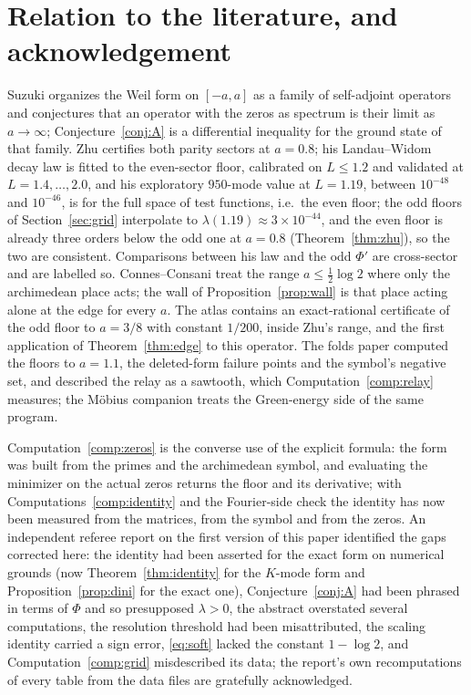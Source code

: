 \documentclass[11pt]{article}
\theoremstyle{definition}
\theoremstyle{remark}
\begin{document}
\section{Relation to the literature, and acknowledgement}\label{sec:lit}

Suzuki \cite{suzuki-screw} organizes the Weil form on $[-a,a]$ as a family of self-adjoint operators and conjectures that an operator with the zeros as spectrum is their limit as $a\to\infty$; Conjecture~\ref{conj:A} is a differential inequality for the ground state of that family. Zhu \cite{zhu} certifies both parity sectors at $a=0.8$; his Landau--Widom decay law is fitted to the even-sector floor, calibrated on $L\le1.2$ and validated at $L=1.4,\dots,2.0$, and his exploratory $950$-mode value at $L=1.19$, between $10^{-48}$ and $10^{-46}$, is for the full space of test functions, i.e.\ the even floor; the odd floors of Section~\ref{sec:grid} interpolate to $\lambda(1.19)\approx3\times10^{-44}$, and the even floor is already three orders below the odd one at $a=0.8$ (Theorem~\ref{thm:zhu}), so the two are consistent. Comparisons between his law and the odd $\Phi'$ are cross-sector and are labelled so. Connes--Consani \cite{connes-consani} treat the range $a\le\tfrac12\log2$ where only the archimedean place acts; the wall of Proposition~\ref{prop:wall} is that place acting alone at the edge for every $a$. The atlas \cite{michaels-atlas} contains an exact-rational certificate of the odd floor to $a=3/8$ with constant $1/200$, inside Zhu's range, and the first application of Theorem~\ref{thm:edge} to this operator. The folds paper \cite{michaels-folds} computed the floors to $a=1.1$, the deleted-form failure points and the symbol's negative set, and described the relay as a sawtooth, which Computation~\ref{comp:relay} measures; the M\"obius companion \cite{michaels-mobius} treats the Green-energy side of the same program.

Computation~\ref{comp:zeros} is the converse use of the explicit formula: the form was built from the primes and the archimedean symbol, and evaluating the minimizer on the actual zeros returns the floor and its derivative; with Computations~\ref{comp:identity} and the Fourier-side check the identity has now been measured from the matrices, from the symbol and from the zeros. An independent referee report on the first version of this paper identified the gaps corrected here: the identity had been asserted for the exact form on numerical grounds (now Theorem~\ref{thm:identity} for the $K$-mode form and Proposition~\ref{prop:dini} for the exact one), Conjecture~\ref{conj:A} had been phrased in terms of $\Phi$ and so presupposed $\lambda>0$, the abstract overstated several computations, the resolution threshold had been misattributed, the scaling identity carried a sign error, \eqref{eq:soft} lacked the constant $1-\log2$, and Computation~\ref{comp:grid} misdescribed its data; the report's own recomputations of every table from the data files are gratefully acknowledged.
\end{document}
